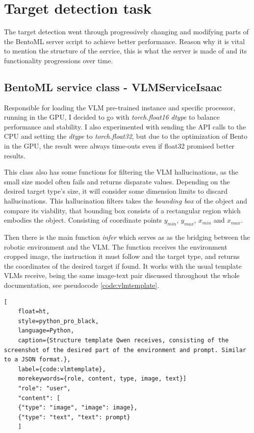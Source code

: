 
\section{Target detection task}
\label{sec:target_detection}
The target detection went through progressively changing and modifying parts of the BentoML server script to achieve better performance. Reason why it is vital to mention the structure of the service, this is what the server is made of and its functionality progressions over time. 

\subsection{BentoML service class - VLMServiceIsaac}
Responsible for loading the VLM pre-trained instance and specific processor, running in the GPU, I decided to go with \textit{torch.float16 dtype} to balance performance and stability. I also experimented with sending the API calls to the CPU and setting the \textit{dtype} to \textit{torch.float32}, but due to the optimization of Bento in the GPU, the result were always time-outs even if float32 promised better results.

This class also has some functions for filtering the VLM hallucinations, as the small size model often fails and returns disparate values. Depending on the desired target type's size, it will consider some dimension limits to discard hallucinations. This hallucination filters takes the \textit{bounding box} of the object and compare its viability, that bounding box consists of a rectangular region which embodies the object. Consisting of coordinate points $y_{min}$, $y_{max}$, $x_{min}$ and $x_{max}$.

Then there is the main function \textit{infer} which serves as as the bridging between the robotic environment and the VLM. The function receives the environment cropped image, the instruction it must follow and the target type, and returns the coordinates of the desired target if found. It works with the usual template VLMs receive, being the same image-text pair discussed throughout the whole documentation, see pseudocode \ref{code:vlmtemplate}. 

\begin{lstlisting}[
	float=ht,
	style=python_pro_black,
	language=Python, 
	caption={Structure template Qwen receives, consisting of the screenshot of the desired part of the environment and prompt. Similar to a JSON format.}, 
	label={code:vlmtemplate},
	morekeywords={role, content, type, image, text}]
	"role": "user",
	"content": [
	{"type": "image", "image": image},
	{"type": "text", "text": prompt}
	]
\end{lstlisting}

